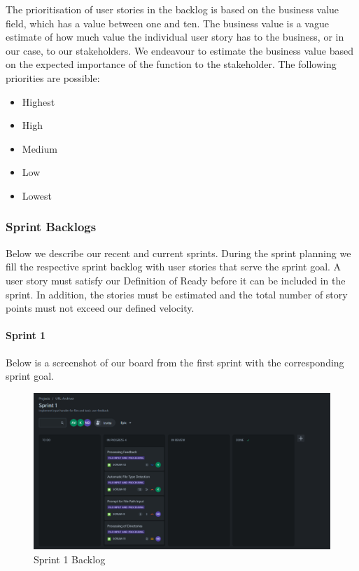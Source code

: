 The prioritisation of user stories in the backlog is based on the business value field, which has a value between one and ten.
The business value is a vague estimate of how much value the individual user story has to the business, or in our case, to our stakeholders.
We endeavour to estimate the business value based on the expected importance of the function to the stakeholder.
The following priorities are possible:
\begin{itemize}
    \item Highest
    \item High
    \item Medium
    \item Low
    \item Lowest
\end{itemize}

\subsubsection{Sprint Backlogs}
Below we describe our recent and current sprints.
During the sprint planning we fill the respective sprint backlog with user stories that serve the sprint goal.
A user story must satisfy our Definition of Ready before it can be included in the sprint.
In addition, the stories must be estimated and the total number of story points must not exceed our defined velocity.

\paragraph{Sprint 1}
Below is a screenshot of our board from the first sprint with the corresponding sprint goal.
\begin{figure}[h!]
    \centering
    \includegraphics[width=1\textwidth]{pictures/backlog_sprint_1}
    \caption{Sprint 1 Backlog}
    \label{fig:backlog_sprint_1}
\end{figure}

